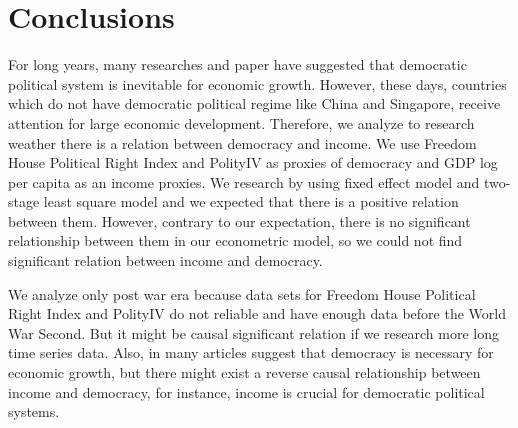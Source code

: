 \newpage
\section{Conclusions}\label{Sec:Conclusion}

\begin{itemize}

For long years, many researches and paper have suggested that democratic political system is inevitable for economic growth. However, these days, countries which do not have democratic political regime like China and Singapore, receive attention for large economic development. Therefore, we analyze to research weather there is a relation between democracy and income. We use Freedom House Political Right Index and PolityI\hspace{-.1em}V as proxies of democracy and GDP log per capita as an income proxies. We research by using fixed effect model and two-stage least square model and we expected that there is a positive relation between them. However, contrary to our expectation, there is no significant relationship between them in our econometric model, so we could not find significant relation between income and democracy. 

We analyze only post war era because data sets for Freedom House Political Right Index and PolityI\hspace{-.1em}V do not reliable and have enough data before the World War Second. But it might be causal significant relation if we research more long time series data. Also, in many articles suggest that democracy is necessary for economic growth, but there might exist a reverse causal relationship between income and democracy, for instance, income is crucial for democratic political systems.


\end{itemize}

